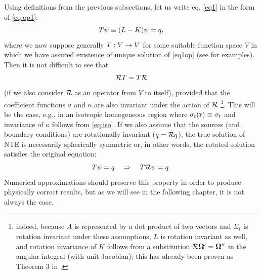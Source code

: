 Using definitions from the previous subsections, let us write eq. \eqref{eq1} in the form of \eqref{eq:op1}:
\begin{equation}\label{eq1op}
	T\psi \equiv (L - K)\psi = q,
\end{equation} 
where we now suppose generally $T:V\to V$ for some suitable function space $V$ in which we have assured existence
of unique solution of \eqref{eq1op} (see  for examples). Then it is not difficult to see that
\begin{equation}\label{eq:commut_NTE}
	\mathcal{R}T = T\mathcal{R}
\end{equation}
(if we also consider $\mathcal{R}$ as an operator from $V$ to itself),
provided that the coefficient functions $\sigma$ and $\kappa$ are also invariant under the action of $\mathcal{R}$ \footnote{
indeed, because $A$ is represented by a dot product of two vectors and $\Sigma_t$ is rotation invariant under these
assumptions, $L$ is rotation invariant as well, and rotation invariance of $K$ follows from a substitution $\mathcal{R}\mathbf{\Omega}' = \mathbf{\Omega}''$ in the
angular integral (with unit Jacobian); this has already been proven as Theorem 3 in \cite{Zweifel}.}.
This will be the case, e.g., in an isotropic homogeneous region where  $\sigma_t(\mathbf{r}) \equiv \sigma_t$ and invariance of
$\kappa$ follows from \eqref{eq:iso}. If we also assume that the sources (and
boundary conditions) are  rotationally invariant ($q = \mathcal{R}q$), the true solution of NTE is necessarily
spherically symmetric or, in other words, the rotated solution satisfies the original equation: 
$$
T\psi = q \quad \Rightarrow \quad T\mathcal{R}\psi = q.
$$
Numerical approximations should preserve this property in order to produce physically correct results, but as we will
see in the following chapter, it is not always the case.
